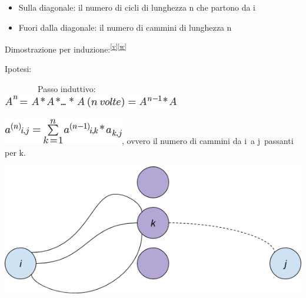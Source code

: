 \documentclass{article}
\providecommand{\tightlist}{%
  \setlength{\itemsep}{0pt}\setlength{\parskip}{0pt}}
\begin{document}
{{{\begin{itemize}
\tightlist
\item
  {Sulla diagonale: il numero di cicli di lunghezza n che partono da i}
\item
  {Fuori dalla diagonale: il numero di cammini di lunghezza n}
\end{itemize}

{}

{Dimostrazione per
induzione:}\textsuperscript{\protect\hyperlink{cmnt22}{{[}v{]}}\protect\hyperlink{cmnt23}{{[}w{]}}}

{Ipotesi:}

{~~~~~~~~Passo induttivo:\\
\hspace*{0.333em}\hspace*{0.333em}\hspace*{0.333em}\hspace*{0.333em}\hspace*{0.333em}\hspace*{0.333em}\hspace*{0.333em}\hspace*{0.333em}\hspace*{0.333em}\hspace*{0.333em}\hspace*{0.333em}\hspace*{0.333em}\hspace*{0.333em}\hspace*{0.333em}\hspace*{0.333em}\hspace*{0.333em}}\includegraphics{images/image418.png}

\includegraphics{images/image419.png}{, ovvero il
numero di cammini da }{i}{~a }{j}{~passanti per }{k}{.}

{\includegraphics{images/image538.png}}

}}}
\end{document}
